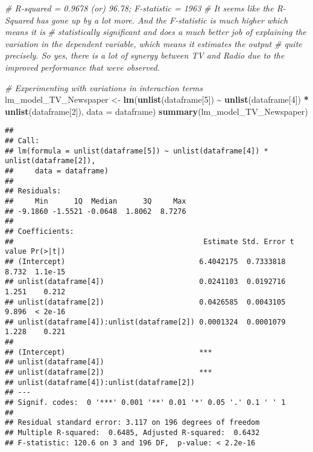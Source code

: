 \documentclass[
]{article}
\newenvironment{Shaded}{\begin{snugshade}}{\end{snugshade}}
\newcommand{\AttributeTok}[1]{\textcolor[rgb]{0.13,0.29,0.53}{#1}}
\newcommand{\CommentTok}[1]{\textcolor[rgb]{0.56,0.35,0.01}{\textit{#1}}}
\newcommand{\DecValTok}[1]{\textcolor[rgb]{0.00,0.00,0.81}{#1}}
\newcommand{\FunctionTok}[1]{\textcolor[rgb]{0.13,0.29,0.53}{\textbf{#1}}}
\newcommand{\NormalTok}[1]{#1}
\newcommand{\OtherTok}[1]{\textcolor[rgb]{0.56,0.35,0.01}{#1}}
\newcommand{\SpecialCharTok}[1]{\textcolor[rgb]{0.81,0.36,0.00}{\textbf{#1}}}
\begin{document}
\begin{Shaded}
\begin{Highlighting}[]
\CommentTok{\# R{-}squared = 0.9678 (or) 96.78; F{-}statistic = 1963}
\CommentTok{\# It seems like the R{-}Squared has gone up by a lot more. And the F{-}statistic is much higher which means it is }
\CommentTok{\# statistically significant and does a much better job of explaining the variation in the dependent variable, which means it estimates the output}
\CommentTok{\# quite precisely. So yes, there is a lot of synergy between TV and Radio due to the improved performance that we\textquotesingle{}ve observed.}

\CommentTok{\# Experimenting with variations in interaction terms}
\NormalTok{lm\_model\_TV\_Newspaper }\OtherTok{\textless{}{-}} \FunctionTok{lm}\NormalTok{(}\FunctionTok{unlist}\NormalTok{(dataframe[}\DecValTok{5}\NormalTok{]) }\SpecialCharTok{\textasciitilde{}} \FunctionTok{unlist}\NormalTok{(dataframe[}\DecValTok{4}\NormalTok{]) }\SpecialCharTok{*} \FunctionTok{unlist}\NormalTok{(dataframe[}\DecValTok{2}\NormalTok{]), }\AttributeTok{data =}\NormalTok{ dataframe)}
\FunctionTok{summary}\NormalTok{(lm\_model\_TV\_Newspaper)}
\end{Highlighting}
\end{Shaded}

\begin{verbatim}
## 
## Call:
## lm(formula = unlist(dataframe[5]) ~ unlist(dataframe[4]) * unlist(dataframe[2]), 
##     data = dataframe)
## 
## Residuals:
##     Min      1Q  Median      3Q     Max 
## -9.1860 -1.5521 -0.0648  1.8062  8.7276 
## 
## Coefficients:
##                                            Estimate Std. Error t value Pr(>|t|)
## (Intercept)                               6.4042175  0.7333818   8.732  1.1e-15
## unlist(dataframe[4])                      0.0241103  0.0192716   1.251    0.212
## unlist(dataframe[2])                      0.0426585  0.0043105   9.896  < 2e-16
## unlist(dataframe[4]):unlist(dataframe[2]) 0.0001324  0.0001079   1.228    0.221
##                                              
## (Intercept)                               ***
## unlist(dataframe[4])                         
## unlist(dataframe[2])                      ***
## unlist(dataframe[4]):unlist(dataframe[2])    
## ---
## Signif. codes:  0 '***' 0.001 '**' 0.01 '*' 0.05 '.' 0.1 ' ' 1
## 
## Residual standard error: 3.117 on 196 degrees of freedom
## Multiple R-squared:  0.6485, Adjusted R-squared:  0.6432 
## F-statistic: 120.6 on 3 and 196 DF,  p-value: < 2.2e-16
\end{verbatim}
\end{document}
